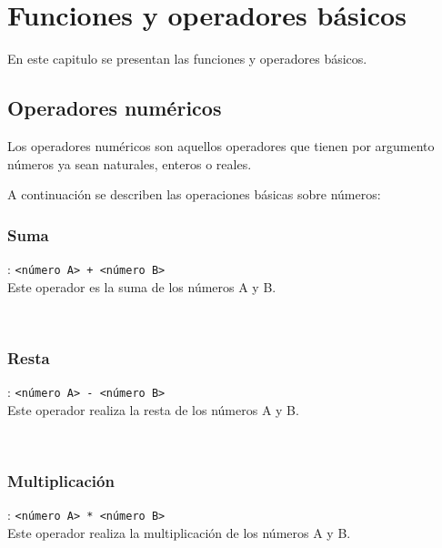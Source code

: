 
\titlespacing{\subsection}{0pt}{10pt}{0pt}

\chapter{Funciones y operadores básicos}
   En este capitulo se presentan las funciones y operadores básicos.
   
   \section{Operadores numéricos}
      Los operadores numéricos son aquellos operadores que tienen por argumento números ya sean naturales, enteros o reales.
      
      A continuación se describen las operaciones básicas sobre números:
      
      \subsection*{Suma}: \texttt{<número A>~+ <número B>}\\
      Este operador es la suma de los números A y B.
      
      \begin{fxcode}
         \\
      \end{fxcode}
      
      \subsection*{Resta}: \texttt{<número A>~\texttt{-} <número B>}\\
      Este operador realiza la resta de los números A y B.
      
      \begin{fxcode}
         \\
      \end{fxcode}
      
      \subsection*{Multiplicación}: \texttt{<número A>~* <número B>}\\
      Este operador realiza la multiplicación de los números A y B.
      
